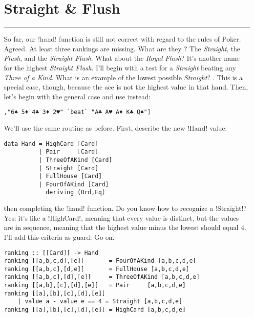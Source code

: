 \newpage
\section{Straight \& Flush} 
\vspace{10cm}
\hrule

\lhQ So far, our \il!hand! function is still not correct with regard to the rules of Poker.
\lhA Agreed. At least three rankings are missing.
\lhN What are they ?
\lhA The \emph{Straight}, the \emph{Flush}, and the \emph{Straight Flush}.
\lhN What about the \emph{Royal Flush}?
\lhA It's another name for the highest \emph{Straight Flush}.
\lhN I'll begin with a test for a \emph{Straight} beating any \emph{Three of a Kind}. What is an example of the lowest possible \emph{Straight}?
\lhA {}    . This is a special case, though, because the ace is not the highest value in that hand.
\lhN Then, let's begin with the general case and use      instead:
\begin{lstlisting}[frame=single]
        ,"6♠ 5♦ 4♣ 3♦ 2♥" `beat` "A♣ A♥ A♦ K♣ Q♠"]
\end{lstlisting}
\hspace*{\fill}
\lhA \failure We'll use the same routine as before. First, describe the new \il!Hand! value:
\begin{lstlisting}[frame=single]
data Hand = HighCard [Card]
          | Pair     [Card]
          | ThreeOfAKind [Card]
          | Straight [Card]
          | FullHouse [Card]
          | FourOfAKind [Card]
            deriving (Ord,Eq)
\end{lstlisting}
\error then completing the \il!hand! function.
\lhN Do you know how to recognize a \il!Straight!?
\lhA \error Yes: it's like a \il!HighCard!, meaning that every value is distinct, but the values are in sequence, meaning that the highest value minus the lowest should equal 4. I'll add this criteria as guard:
\lhN Go on.
\lhA
\begin{lstlisting}[frame=single]
ranking :: [[Card]] -> Hand
ranking [[a,b,c,d],[e]]       = FourOfAKind [a,b,c,d,e]
ranking [[a,b,c],[d,e]]       = FullHouse [a,b,c,d,e]
ranking [[a,b,c],[d],[e]]     = ThreeOfAKind [a,b,c,d,e]
ranking [[a,b],[c],[d],[e]]   = Pair     [a,b,c,d,e]
ranking [[a],[b],[c],[d],[e]] 
    | value a - value e == 4 = Straight [a,b,c,d,e] 
ranking [[a],[b],[c],[d],[e]] = HighCard [a,b,c,d,e] 
\end{lstlisting}
